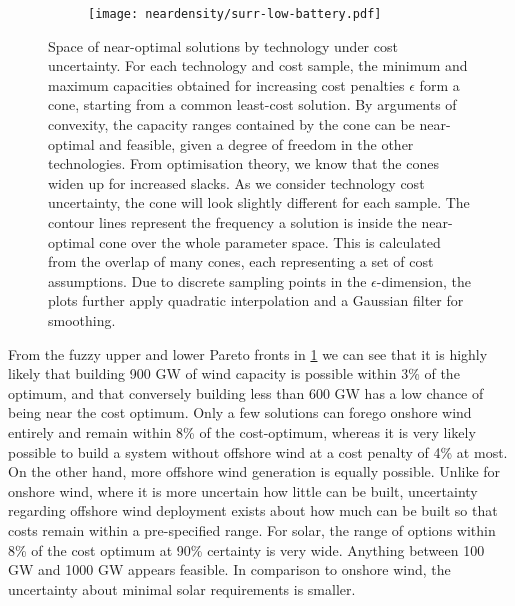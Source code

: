 \begin{figure}
{\begin{subfigure}[t]{0.45\textwidth}
            \centering
        \texttt{[image: neardensity/surr-low-battery.pdf]}
    \end{subfigure}
    }
    \caption{
    Space of near-optimal solutions by technology under cost uncertainty.
    For each technology and cost sample,
    the minimum and maximum capacities obtained for increasing cost penalties
    $\epsilon$ form a cone, starting from a common least-cost solution.
    By arguments of convexity, the capacity ranges contained by the cone can be near-optimal and feasible, given a degree of freedom in the other technologies.
    From optimisation theory, we know that the cones widen up for increased slacks.
    As we consider technology cost uncertainty, the cone will look slightly different for each sample.
    The contour lines represent the frequency a solution is inside the near-optimal cone over the whole parameter space.
    This is calculated from the overlap of many cones, each representing a set of cost assumptions.
    Due to discrete sampling points in the $\epsilon$-dimension, the plots further apply quadratic interpolation and a Gaussian filter for smoothing.
    }
    \label{fig:fuzzycone}
\end{figure}

From the fuzzy upper and lower Pareto fronts in \cref{fig:fuzzycone} we can see that it is
highly likely that building 900 GW of wind capacity is possible within 3\% of the optimum, and that
conversely building less than 600 GW has a low chance of being near the cost optimum.
Only a few solutions can forego onshore wind entirely and remain within 8\% of the cost-optimum,
whereas it is very likely possible to build a system without offshore wind at a cost penalty of 4\% at most.
On the other hand, more offshore wind generation is equally possible.
Unlike for onshore wind, where it is more uncertain how little can be built,
uncertainty regarding offshore wind deployment exists about how much can be built
so that costs remain within a pre-specified range.
For solar, the range of options within 8\% of the cost optimum at 90\% certainty is very wide.
Anything between 100 GW and 1000 GW appears feasible.
In comparison to onshore wind, the uncertainty about minimal solar requirements is smaller.

